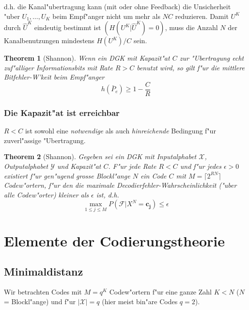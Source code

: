\documentclass[german, 10pt, a4paper, twocolumn]{scrartcl}
\newtheorem{theorem}{Theorem}
\begin{document}
d.h. die Kanal"ubertragung kann (mit oder ohne Feedback) die Unsicherheit "uber $U_1,\ldots, U_K$ beim Empf"anger nicht um mehr als $NC$ reduzieren. Damit $U^K$ durch $\hat{U}^K$ eindeutig bestimmt ist $(H(U^K|\hat{U}^K)=0)$, muss die Anzahl $N$ der Kanalbenutzungen mindestens $H(U^K)/C$ sein.

\begin{theorem}[Shannon]
	Wenn ein DGK mit Kapazit"at $C$ zur "Ubertragung echt zuf"alliger Informationsbits mit Rate $R > C$ benutzt wird, so gilt f"ur die mittlere Bitfehler-W'keit beim Empf"anger
	\begin{displaymath}
		h(\bar{P}_e) \geq 1 - \frac{C}{R}
	\end{displaymath}
\end{theorem}

\subsubsection{Die Kapazit"at ist erreichbar}

$R < C$ ist sowohl eine \textit{notwendige} als auch \textit{hinreichende} Bedingung f"ur zuverl"assige "Ubertragung.

\begin{theorem}[Shannon]
	Gegeben sei ein DGK mit Inputalphabet $\mathcal{X}$, Outputalphabet $\mathcal{Y}$ und Kapazit"at $C$. F"ur jede Rate $R < C$ und f"ur jedes $\epsilon > 0$ existiert f"ur gen"ugend grosse Blockl"ange $N$ ein Code $C$ mit $M=\lceil 2^{RN} \rceil$ Codew"ortern, f"ur den die maximale Decodierfehler-Wahrscheinlichkeit ("uber alle Codew"orter) kleiner als $\epsilon$ ist, d.h.
	\begin{displaymath}
		\max_{1 \leq j \leq M} P (\mathcal{F}| X^N = \mathbf{c_j}) \leq \epsilon
	\end{displaymath}
\end{theorem}

\section{Elemente der Codierungstheorie}

\subsection{Minimaldistanz}

Wir betrachten Codes mit $M=q^K$ Codew"ortern f"ur eine ganze Zahl $K < N$ ($N$ = Blockl"ange) und f"ur $|\mathcal{X}|=	q$ (hier meist bin"are Codes $q=2$).\\
\end{document}

